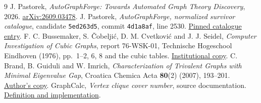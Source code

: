 \documentclass[11pt]{article}
\begin{document}
\begin{thebibliography}{9}
J. Pastorek, \emph{AutoGraphForge: Towards Automated Graph Theory Discovery},
2026. \href{https://arxiv.org/abs/2609.03478}{arXiv:2609.03478}.
J. Pastorek, \emph{AutoGraphForge, normalized survivor catalogue}, candidate
\texttt{5ed263d5}, commit \texttt{4d1a8af}, line 2530.
\href{https://github.com/JanPastorek/AutoGraphForge/blob/4d1a8afc99447cacd2328cca20e47b6493e8dbc5/results/survivors_by_touch_normalised.txt\#L2530}{Pinned catalogue entry}.
F. C. Bussemaker, S. \v{C}obelji\'{c}, D. M. Cvetkovi\'{c} and J. J. Seidel,
\emph{Computer Investigation of Cubic Graphs}, report 76-WSK-01,
Technische Hogeschool Eindhoven (1976), pp.~1--2, 6, 8 and the cubic tables.
\href{https://pure.tue.nl/ws/files/1713766/252909.pdf}{Institutional copy}.
C. Brand, B. Guiduli and W. Imrich, \emph{Characterization of Trivalent
Graphs with Minimal Eigenvalue Gap}, Croatica Chemica Acta \textbf{80}(2)
(2007), 193--201.
\href{https://people.cs.uchicago.edu/~laci/students/guiduli.dir/barry-brand-imrich.pdf}{Author's copy}.
GraphCalc, \emph{Vertex clique cover number}, source documentation.
\href{https://graphcalc.readthedocs.io/en/stable/_modules/graphcalc/graphs/invariants/classics.html\#vertex_clique_cover_number}{Definition and implementation}.
\end{thebibliography}
\end{document}
